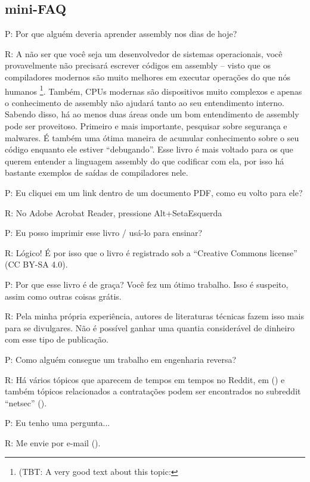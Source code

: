 \subsection*{mini-FAQ}

\par P: Por que alguém deveria aprender assembly nos dias de hoje?
\par R: A não ser que você seja um desenvolvedor de sistemas operacionais, você provavelmente não precisará escrever códigos em assembly – visto que os compiladores modernos são muito melhores em executar operações 
do que nós humanos
\footnote{(\ac{TBT}: A very good text about this topic: \InSqBrackets{\AgnerFog}}.
Também, \ac{CPU}s modernas são dispositivos muito complexos e apenas o conhecimento de assembly não ajudará tanto ao seu entendimento interno. Sabendo disso, há ao menos duas áreas onde um bom entendimento de assembly pode ser proveitoso. Primeiro e mais importante, pesquisar sobre segurança e malwares. É também uma ótima maneira de acumular conhecimento sobre o seu código enquanto ele estiver “debugando”. Esse livro é mais voltado para os que querem entender a linguagem assembly do que codificar com ela, por isso há bastante exemplos de saídas de compiladores nele.

\par P: Eu cliquei em um link dentro de um documento PDF, como eu volto para ele?
\par R: No Adobe Acrobat Reader, pressione Alt+SetaEsquerda

\par P: Eu posso imprimir esse livro / usá-lo para ensinar?
\par R: Lógico! É por isso que o livro é registrado sob a “Creative Commons license” (CC BY-SA 4.0).

\par P: Por que esse livro é de graça? Você fez um ótimo trabalho. Isso é suspeito, assim como outras coisas grátis.
\par R: Pela minha própria experiência, autores de literaturas técnicas fazem isso mais para se divulgares. Não é possível ganhar uma quantia considerável de dinheiro com esse tipo de publicação.

\par P: Como alguém consegue um trabalho em engenharia reversa?
\par R: Há vários tópicos que aparecem de tempos em tempos no Reddit\FNURLREDDIT{}, em (\RedditHiringThread{})
e também tópicos relacionados a contratações podem ser encontrados no subreddit ``netsec'' (\NetsecHiringThread{}).

\par P: Eu tenho uma pergunta...
\par R: Me envie por e-mail (\EMAIL).

